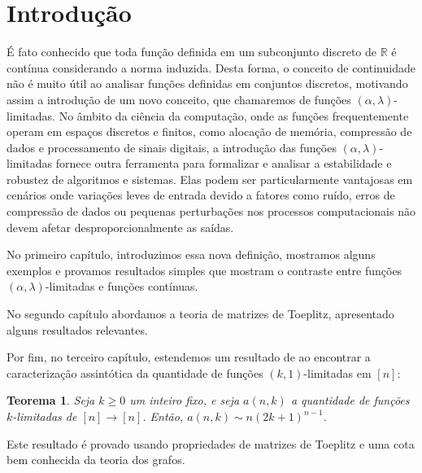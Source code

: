 \documentclass[a4paper,12pt]{article}
\newtheorem*{theorem*}{Teorema}
\theoremstyle{definition}
\begin{document}






\tableofcontents

\newpage

\setcounter{page}{8}
\section*{Introdução}

\vspace{1cm}
\normalsize
É fato conhecido que toda função definida em um subconjunto discreto de $\mathbb{R}$ é contínua considerando a norma induzida. Desta forma, o conceito de continuidade não é muito útil ao analisar funções definidas em conjuntos discretos, motivando assim a introdução de um novo conceito, que chamaremos de funções $(\alpha,\lambda)$-limitadas. No âmbito da ciência da computação, onde as funções frequentemente operam em espaços discretos e finitos, como alocação de memória, compressão de dados e processamento de sinais digitais, a introdução das funções $(\alpha,\lambda)$-limitadas fornece outra ferramenta para formalizar e analisar a estabilidade e robustez de algoritmos e sistemas. Elas podem ser particularmente vantajosas em cenários onde variações leves de entrada devido a fatores como ruído, erros de compressão de dados ou pequenas perturbações nos processos computacionais não devem afetar desproporcionalmente as saídas.

No primeiro capítulo, introduzimos essa nova definição, mostramos alguns exemplos e provamos resultados simples que mostram o contraste entre funções $(\alpha,\lambda)$-limitadas e funções contínuas.

No segundo capítulo abordamos a teoria de matrizes de Toeplitz, apresentado alguns resultados relevantes.

Por fim, no terceiro capítulo, estendemos um resultado de \cite{coulson} ao encontrar a caracterização assintótica da quantidade de funções $(k,1)$-limitadas em $[n]$:

\begin{theorem*} Seja $k \ge 0$ um inteiro fixo, e seja $a(n, k)$ a quantidade de funções $k$-limitadas de $[n]\to[n]$. Então, $a(n,k) \sim n(2k+1)^{n-1}$. \end{theorem*}

Este resultado é provado usando propriedades de matrizes de Toeplitz e uma cota bem conhecida da teoria dos grafos.
\end{document}
